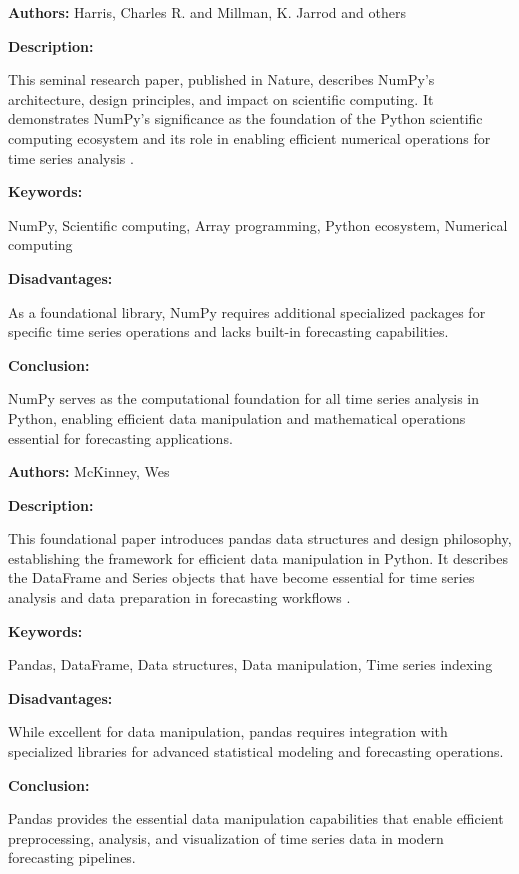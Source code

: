 
{ 
	
	\textbf{Authors:} Harris, Charles R. and Millman, K. Jarrod and others
	
	\textbf{Description:}
	
	This seminal research paper, published in Nature, describes NumPy's architecture, design principles, and impact on scientific computing. It demonstrates NumPy's significance as the foundation of the Python scientific computing ecosystem and its role in enabling efficient numerical operations for time series analysis \autocite{Harris:2020}.
	
	\textbf{Keywords:}
	
	NumPy, Scientific computing, Array programming, Python ecosystem, Numerical computing
	
	\textbf{Disadvantages:}
	
	As a foundational library, NumPy requires additional specialized packages for specific time series operations and lacks built-in forecasting capabilities.
	
	\textbf{Conclusion:}
	
	NumPy serves as the computational foundation for all time series analysis in Python, enabling efficient data manipulation and mathematical operations essential for forecasting applications.
	
}


{ 
	
	\textbf{Authors:} McKinney, Wes
	
	\textbf{Description:}
	
	This foundational paper introduces pandas data structures and design philosophy, establishing the framework for efficient data manipulation in Python. It describes the DataFrame and Series objects that have become essential for time series analysis and data preparation in forecasting workflows \autocite{McKinney:2010}.
	
	\textbf{Keywords:}
	
	Pandas, DataFrame, Data structures, Data manipulation, Time series indexing
	
	\textbf{Disadvantages:}
	
	While excellent for data manipulation, pandas requires integration with specialized libraries for advanced statistical modeling and forecasting operations.
	
	\textbf{Conclusion:}
	
	Pandas provides the essential data manipulation capabilities that enable efficient preprocessing, analysis, and visualization of time series data in modern forecasting pipelines.
	
}

